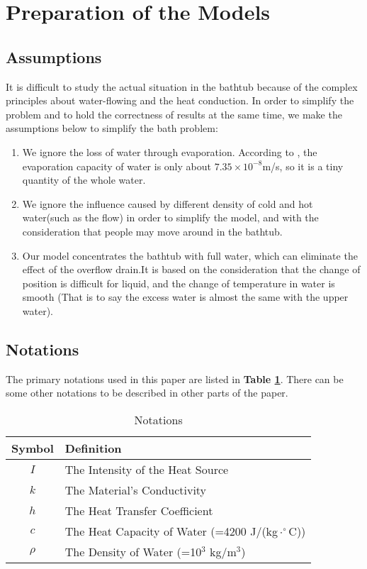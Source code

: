 \documentclass[12pt]{article}
\begin{document}
\section{Preparation of the Models}
\subsection{Assumptions}
It is difficult to study the actual situation in the bathtub because of the complex principles about
water-flowing and the heat conduction. In order to simplify the problem and to hold the correctness
of results at the same time, we make the assumptions below to simplify the bath
problem:
\begin{enumerate}[\bfseries 1.]
    \item We ignore the loss of water through evaporation. According to \cite{12}, the evaporation
    capacity of water is only about $7.35\times10^{-8}$m/s, so it is a tiny quantity of the whole
    water.
    \item We ignore the influence caused by different density of cold and hot water(such as the
    flow) in order to simplify the model, and with the consideration that people may move around in
    the bathtub.
    \item Our model concentrates the bathtub with full water, which can eliminate the effect of the
    overflow drain.It is based on the consideration that the change of position is difficult for
    liquid, and the change of temperature in water is smooth (That is to say the excess water is
    almost the same with the upper water).
\end{enumerate}

\subsection{Notations}
The primary notations used in this paper are listed in \textbf{Table \ref{Ntt}}. There can be some
other notations to be described in other parts of the paper.
\begin{table}[!htbp]
\begin{center}
\caption{Notations}
\begin{tabular}{cl}
    \toprule
    \multicolumn{1}{m{3cm}}{\centering Symbol}
    &\multicolumn{1}{m{8cm}}{\centering Definition}\\
    \midrule
    $I$&The Intensity of the Heat Source\\
    $k$&The Material's Conductivity\\
    $h$&The Heat Transfer Coefficient\\
    $c$&The Heat Capacity of Water (=4200 J/(kg$\cdot^\circ$C))\\
    $\rho$&The Density of Water (=10$^3$ kg/m$^3$)\\
    \bottomrule
\end{tabular}\label{Ntt}
\end{center}
\end{table}
\end{document}
